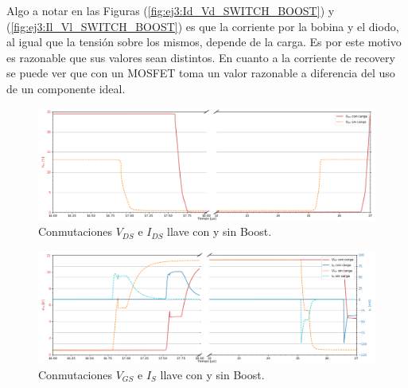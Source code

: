 Algo a notar en las Figuras (\ref{fig:ej3:Id_Vd_SWITCH_BOOST}) y (\ref{fig:ej3:Il_Vl_SWITCH_BOOST}) es que la corriente por la bobina y el diodo, al igual que la tensión sobre los mismos, depende de la carga. Es por este motivo es razonable que sus valores sean distintos. En cuanto a la corriente de recovery se puede ver que con un MOSFET toma un valor razonable a diferencia del uso de un componente ideal. 
\begin{multicols}{2}
\begin{figure}[H]
	\centering
	\includegraphics[width=\linewidth]{ImagenesEjercicio-3/ids-vds-1v3}
	\caption{Conmutaciones $V_{DS}$ e  $I_{DS}$ llave con y sin Boost.}
	\label{fig:ej3:conmutacionON_OFF_VDS_IDS_SWITCH_BOOST}
\end{figure}
\begin{figure}[H]
	\centering
	\includegraphics[width=\linewidth]{ImagenesEjercicio-3/ig-vgs-1v3}
	\caption{Conmutaciones $V_{GS}$ e  $I_{S}$ llave con y sin Boost.}
	\label{fig:ej3:conmutacionON_OFF_VGS_IG_SWITCH_BOOST}
\end{figure}
\end{multicols}
